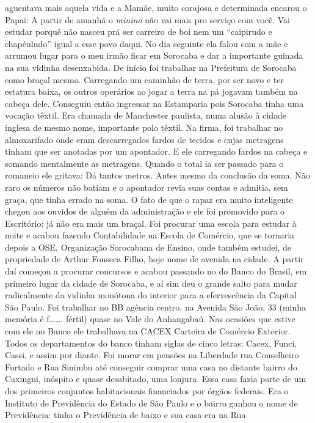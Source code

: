 \documentclass[12pt,brazil,]{book}
\begin{document}
aguentava mais aquela vida e a Mamãe, muito corajosa e determinada
encarou o Papai: A partir de amanhã o \emph{minino} não vai mais pro
serviço com você. Vai estudar porquê não nasceu prá ser carreiro de boi
nem um ``caipirudo e chapéuludo'' igual a esse povo daqui. No dia
seguinte ela falou com a mãe e arrumou lugar para o meu irmão ficar em
Sorocaba e dar a importante guinada na sua vidinha desenxabida. De
início foi trabalhar na Prefeitura de Sorocaba como braçal mesmo.
Carregando um caminhão de terra, por ser novo e ter estatura baixa, os
outros operários ao jogar a terra na pá jogavam também na cabeça dele.
Conseguiu então ingressar na Estamparia pois Sorocaba tinha uma vocação
têxtil. Era chamada de Manchester paulista, numa alusão à cidade inglesa
de mesmo nome, importante polo têxtil. Na firma, foi trabalhar no
almoxarifado onde eram descarregados fardos de tecidos e cujas metragens
tinham que ser anotadas por um apontador. E ele carregando fardos na
cabeça e somando mentalmente as metragens. Quando o total ia ser passado
para o romaneio ele gritava: Dá tantos metros. Antes mesmo da conclusão
da soma. Não raro os números não batiam e o apontador revia suas contas
e admitia, sem graça, que tinha errado na soma. O fato de que o rapaz
era muito inteligente chegou aos ouvidos de alguém da administração e
ele foi promovido para o Escritório: já não era mais um braçal. Foi
procurar uma escola para estudar à noite e acabou fazendo Contabilidade
na Escola de Comércio, que se tornaria depois a OSE, Organização
Sorocabana de Ensino, onde também estudei, de propriedade de Arthur
Fonseca Filho, hoje nome de avenida na cidade. A partir daí começou a
procurar concursos e acabou passando no do Banco do Brasil, em primeiro
lugar da cidade de Sorocaba, e aí sim deu o grande salto para mudar
radicalmente da vidinha monótona do interior para a efervescência da
Capital São Paulo. Foi trabalhar no BB agência centro, na Avenida São
João, 33 (minha memória é f\ldots{}\ldots{}. fértil) quase no Vale do
Anhangabaú. Nas ocasiões que estive com ele no Banco ele trabalhava na
CACEX Carteira de Comércio Exterior. Todos os departamentos do banco
tinham siglas de cinco letras: Cacex, Funci, Cassi, e assim por diante.
Foi morar em pensões na Liberdade rua Conselheiro Furtado e Rua Sinimbu
até conseguir comprar uma casa no distante bairro do Caxingui, inóspito
e quase desabitado, uma lonjura. Essa casa fazia parte de um dos
primeiros conjuntos habitacionais financiados por órgãos federais. Era o
Instituto de Previdência do Estado de São Paulo e o bairro ganhou o nome
de Previdência: tinha o Previdência de baixo e sua casa era na Rua
\end{document}
